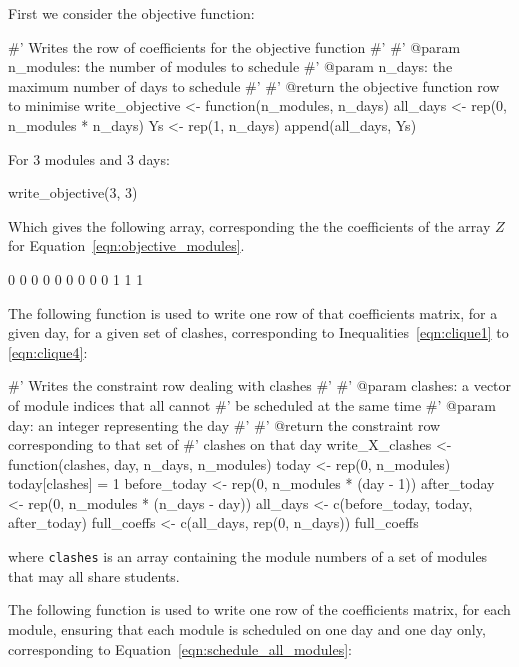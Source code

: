 First we consider the objective function:

\begin{Rin-no-test}
#' Writes the row of coefficients for the objective function
#'
#' @param n_modules: the number of modules to schedule
#' @param n_days: the maximum number of days to schedule
#'
#' @return the objective function row to minimise
write_objective <- function(n_modules, n_days){
  all_days <- rep(0, n_modules * n_days)
  Ys <- rep(1, n_days)
  append(all_days, Ys)
}
\end{Rin-no-test}

For 3 modules and 3 days:

\begin{Rin-no-test}
write_objective(3, 3)
\end{Rin-no-test}

Which gives the following array, corresponding the the coefficients of the
array $Z$ for Equation~\ref{eqn:objective_modules}.

\begin{Rout-no-test}
[1] 0 0 0 0 0 0 0 0 0 1 1 1
\end{Rout-no-test}

The following function is used to write one row of that coefficients matrix, for
a given day, for a given set of clashes, corresponding to
Inequalities~\ref{eqn:clique1} to \ref{eqn:clique4}:

\begin{Rin-no-test}
#' Writes the constraint row dealing with clashes
#'
#' @param clashes: a vector of module indices that all cannot
#'                 be scheduled at the same time
#' @param day: an integer representing the day
#'
#' @return the constraint row corresponding to that set of
#'         clashes on that day
write_X_clashes <- function(clashes, day, n_days, n_modules){
  today <- rep(0, n_modules)
  today[clashes] = 1
  before_today <- rep(0, n_modules * (day - 1))
  after_today <- rep(0, n_modules * (n_days - day))
  all_days <- c(before_today, today, after_today)
  full_coeffs <- c(all_days, rep(0, n_days))
  full_coeffs
}
\end{Rin-no-test}

where \texttt{clashes} is an array containing the module numbers of a set of
modules that may all share students.

The following function is used to write one row of the coefficients matrix, for
each module, ensuring that each module is scheduled on one day and one day only,
corresponding to Equation~\ref{eqn:schedule_all_modules}:

